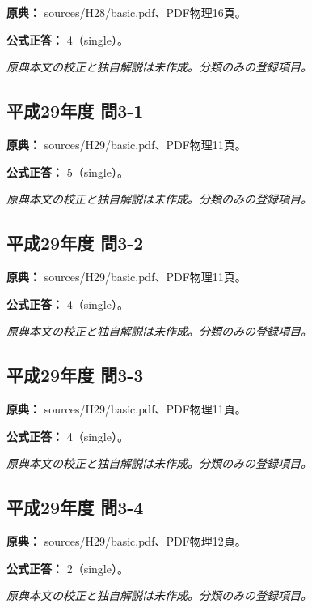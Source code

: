 \noindent\textbf{原典：} sources/H28/basic.pdf、PDF物理16頁。

\textbf{公式正答：} 4（single）。

\par\textit{原典本文の校正と独自解説は未作成。分類のみの登録項目。}

\subsection{平成29年度 問3-1}
\label{q:h29-reg-basic-3-1}

\noindent\textbf{原典：} sources/H29/basic.pdf、PDF物理11頁。

\textbf{公式正答：} 5（single）。

\par\textit{原典本文の校正と独自解説は未作成。分類のみの登録項目。}

\subsection{平成29年度 問3-2}
\label{q:h29-reg-basic-3-2}

\noindent\textbf{原典：} sources/H29/basic.pdf、PDF物理11頁。

\textbf{公式正答：} 4（single）。

\par\textit{原典本文の校正と独自解説は未作成。分類のみの登録項目。}

\subsection{平成29年度 問3-3}
\label{q:h29-reg-basic-3-3}

\noindent\textbf{原典：} sources/H29/basic.pdf、PDF物理11頁。

\textbf{公式正答：} 4（single）。

\par\textit{原典本文の校正と独自解説は未作成。分類のみの登録項目。}

\subsection{平成29年度 問3-4}
\label{q:h29-reg-basic-3-4}

\noindent\textbf{原典：} sources/H29/basic.pdf、PDF物理12頁。

\textbf{公式正答：} 2（single）。

\par\textit{原典本文の校正と独自解説は未作成。分類のみの登録項目。}

